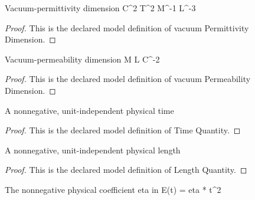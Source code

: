 \begin{definition}
  \label{def:physics:phyx-mini-0983:phyxminiproblems-problemphyxmini0983-vacuumpermittivitydimension}
  Vacuum-permittivity dimension C\textasciicircum{}2 T\textasciicircum{}2 M\textasciicircum{}-1 L\textasciicircum{}-3
\end{definition}
\begin{proof}
  This is the declared model definition of vacuum Permittivity Dimension.
\end{proof}
\begin{definition}
  \label{def:physics:phyx-mini-0983:phyxminiproblems-problemphyxmini0983-vacuumpermeabilitydimension}
  Vacuum-permeability dimension M L C\textasciicircum{}-2
\end{definition}
\begin{proof}
  This is the declared model definition of vacuum Permeability Dimension.
\end{proof}
\begin{definition}
  \label{def:physics:phyx-mini-0983:phyxminiproblems-problemphyxmini0983-timequantity}
  A nonnegative, unit-independent physical time
\end{definition}
\begin{proof}
  This is the declared model definition of Time Quantity.
\end{proof}
\begin{definition}
  \label{def:physics:phyx-mini-0983:phyxminiproblems-problemphyxmini0983-lengthquantity}
  A nonnegative, unit-independent physical length
\end{definition}
\begin{proof}
  This is the declared model definition of Length Quantity.
\end{proof}
\begin{definition}
  \label{def:physics:phyx-mini-0983:phyxminiproblems-problemphyxmini0983-electricfieldquadraticcoefficientmagnitude}
  The nonnegative physical coefficient eta in E(t) = eta * t\textasciicircum{}2
\end{definition}
